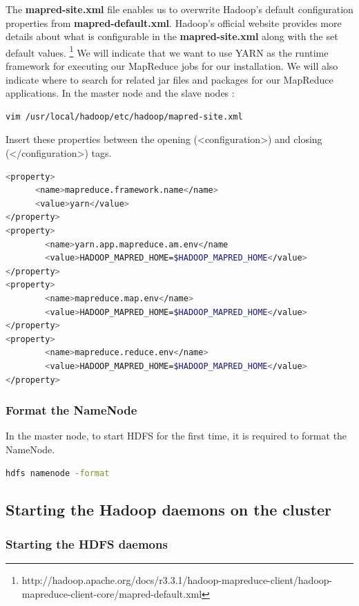 \documentclass[12pt,english]{book}
\begin{document}
The \textbf{mapred-site.xml} file enables us to overwrite Hadoop's default configuration properties from \textbf{mapred-default.xml}.
Hadoop's official website provides more details about what is configurable in the \textbf{mapred-site.xml} along with the set default values.
\footnote{http://hadoop.apache.org/docs/r3.3.1/hadoop-mapreduce-client/hadoop-mapreduce-client-core/mapred-default.xml}
We will indicate that we want to use YARN as the runtime framework for executing our MapReduce jobs for our installation. We will also indicate where to search for related jar files and packages for our MapReduce applications.
In the master node and the slave nodes :
\begin{lstlisting}[language=bash, frame=single, basicstyle=\footnotesize]
vim /usr/local/hadoop/etc/hadoop/mapred-site.xml 
\end{lstlisting}
Insert these properties between the opening (<configuration>) and closing (</configuration>) tags. 
\begin{lstlisting}[language=bash, frame=single, basicstyle=\footnotesize]
<property>
      <name>mapreduce.framework.name</name>
      <value>yarn</value>
</property>
<property>
        <name>yarn.app.mapreduce.am.env</name
        <value>HADOOP_MAPRED_HOME=$HADOOP_MAPRED_HOME</value>
</property>
<property>
        <name>mapreduce.map.env</name>
        <value>HADOOP_MAPRED_HOME=$HADOOP_MAPRED_HOME</value>
</property>
<property>
        <name>mapreduce.reduce.env</name>
        <value>HADOOP_MAPRED_HOME=$HADOOP_MAPRED_HOME</value>
</property>
\end{lstlisting}


\subsubsection{Format the NameNode}


In the master node, to start HDFS for the first time, it is required to format the NameNode.
\begin{lstlisting}[language=bash, frame=single, basicstyle=\footnotesize]
hdfs namenode -format
\end{lstlisting}


\subsection{Starting the Hadoop daemons on the cluster}


\subsubsection{Starting the HDFS daemons}
\end{document}
